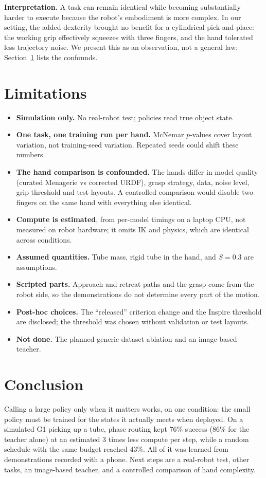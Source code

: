 \documentclass[10pt,twocolumn]{article}
\begin{document}
\textbf{Interpretation.} A task can remain identical while becoming substantially harder to execute because the robot's
embodiment is more complex. In our setting, the added dexterity brought no benefit for a cylindrical pick-and-place: the
working grip effectively squeezes with three fingers, and the hand tolerated less trajectory noise. We present this as an
observation, not a general law; Section~\ref{sec:limits} lists the confounds.

\section{Limitations}\label{sec:limits}
\begin{itemize}\setlength{\itemsep}{1pt}
\item \textbf{Simulation only.} No real-robot test; policies read true object state.
\item \textbf{One task, one training run per hand.} McNemar $p$-values cover layout variation, not training-seed
variation. Repeated seeds could shift these numbers.
\item \textbf{The hand comparison is confounded.} The hands differ in model quality (curated Menagerie vs corrected
URDF), grasp strategy, data, noise level, grip threshold and test layouts. A controlled comparison would disable two fingers on the same hand with everything else identical.
\item \textbf{Compute is estimated}, from per-model timings on a laptop CPU, not measured on robot hardware; it omits IK
and physics, which are identical across conditions.
\item \textbf{Assumed quantities.} Tube mass, rigid tube in the hand, and $S=0.3$ are assumptions.
\item \textbf{Scripted parts.} Approach and retreat paths and the grasp come from the robot side, so the demonstrations
do not determine every part of the motion.
\item \textbf{Post-hoc choices.} The ``released'' criterion change and the Inspire threshold are disclosed; the threshold
was chosen without validation or test layouts.
\item \textbf{Not done.} The planned generic-dataset ablation and an image-based teacher.
\end{itemize}

\section{Conclusion}
Calling a large policy only when it matters works, on one condition: the small policy must be trained for the states
it actually meets when deployed. On a simulated G1 picking up a tube, phase routing kept 76\% success (86\% for the
teacher alone) at an estimated 3 times less compute per step, while a random schedule with the same budget reached 43\%.
All of it was learned from demonstrations recorded with a phone. Next steps are a real-robot test, other tasks, an
image-based teacher, and a controlled comparison of hand complexity.
\end{document}
